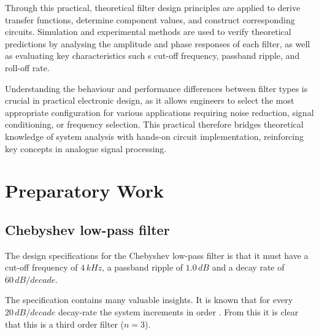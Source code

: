 \documentclass[a4paper, onecolumn, 12pt]{IEEEtran}
\begin{document}
Through this practical, theoretical filter design principles are applied to derive transfer functions, determine component values, and construct corresponding circuits. Simulation and experimental methods are used to verify theoretical predictions by analysing the amplitude and phase responses of each filter, as well as evaluating key characteristics such s cut-off frequency, passband ripple, and roll-off rate.

Understanding the behaviour and performance differences between filter types is crucial in practical electronic design, as it allows engineers to select the most appropriate configuration for various applications requiring noise reduction, signal conditioning, or frequency selection. This practical therefore bridges theoretical knowledge of system analysis with hands-on circuit implementation, reinforcing key concepts in analogue signal processing.

\newpage
\section{Preparatory Work}
\label{sec:preparatory_work}

  \subsection{Chebyshev low-pass filter}
  \label{subsec:prep-low-pass} \strut
  The design specifications for the Chebyshev low-pass filter is that it must have a cut-off frequency of $4\,kHz$, a passband ripple of $1.0\,dB$ and a decay rate of $60\,dB/decade$. 
    
  The specification contains many valuable insights. It is known that for every $20\,dB/decade$ decay-rate the system increments in order \cite{lathi}. From this it is clear that this is a third order filter ($n=3$).
\end{document}
